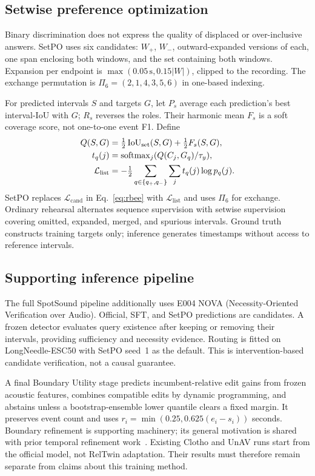 \subsection{Setwise preference optimization}
Binary discrimination does not express the quality of displaced or over-inclusive answers. SetPO uses six candidates: $W_+$, $W_-$, outward-expanded versions of each, one span enclosing both windows, and the set containing both windows. Expansion per endpoint is $\max(0.05\,\mathrm{s},0.15|W|)$, clipped to the recording. The exchange permutation is $\Pi_6=(2,1,4,3,5,6)$ in one-based indexing.

For predicted intervals $S$ and targets $G$, let $P_s$ average each prediction's best interval-IoU with $G$; $R_s$ reverses the roles. Their harmonic mean $F_s$ is a soft coverage score, not one-to-one event F1. Define
\begin{align}
Q(S,G)&=\tfrac12\operatorname{IoU}_{\mathrm{set}}(S,G)+\tfrac12 F_s(S,G),\\
t_q(j)&=\operatorname{softmax}_j(Q(C_j,G_q)/\tau_y),\\
\mathcal L_{\mathrm{list}}&=-\tfrac12\sum_{q\in\{q_+,q_-\}}\sum_j t_q(j)\log p_q(j).
\label{eq:listwise}
\end{align}
SetPO replaces $\mathcal L_{\mathrm{cand}}$ in Eq.~\ref{eq:rbee} with $\mathcal L_{\mathrm{list}}$ and uses $\Pi_6$ for exchange. Ordinary rehearsal alternates sequence supervision with setwise supervision covering omitted, expanded, merged, and spurious intervals. Ground truth constructs training targets only; inference generates timestamps without access to reference intervals.

\subsection{Supporting inference pipeline}
The full SpotSound pipeline additionally uses E004 NOVA (Necessity-Oriented Verification over Audio). Official, SFT, and SetPO predictions are candidates. A frozen detector evaluates query existence after keeping or removing their intervals, providing sufficiency and necessity evidence. Routing is fitted on LongNeedle-ESC50 with SetPO seed~1 as the default. This is intervention-based candidate verification, not a causal guarantee.

A final Boundary Utility stage predicts incumbent-relative edit gains from frozen acoustic features, combines compatible edits by dynamic programming, and abstains unless a bootstrap-ensemble lower quantile clears a fixed margin. It preserves event count and uses $r_i=\min(0.25,0.625(e_i-s_i))$ seconds. Boundary refinement is supporting machinery; its general motivation is shared with prior temporal refinement work~\cite{wang2024timerefine}. Existing Clotho and UnAV runs start from the official model, not RelTwin adaptation. Their results must therefore remain separate from claims about this training method.
